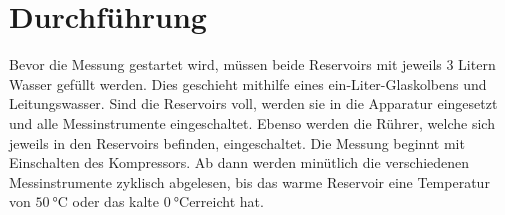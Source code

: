 \section{Durchführung}
\label{sec:Durchführung}
Bevor die Messung gestartet wird, müssen beide Reservoirs mit jeweils 3 Litern Wasser gefüllt werden.
Dies geschieht mithilfe eines ein-Liter-Glaskolbens und Leitungswasser. Sind die Reservoirs voll, werden
sie in die Apparatur eingesetzt und alle Messinstrumente eingeschaltet. Ebenso werden die Rührer, 
welche sich jeweils in den Reservoirs befinden, eingeschaltet. Die Messung beginnt mit 
Einschalten des Kompressors. Ab dann werden minütlich die verschiedenen Messinstrumente zyklisch abgelesen,
bis das warme Reservoir eine Temperatur von $\qty{50}{\celsius}$ oder das kalte 
$\qty{0}{\celsius}$erreicht hat. 
